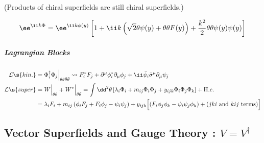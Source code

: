 \begin{flushright}\footnotesize
(Products of chiral superfields are still chiral superfields.)
\end{flushright}
\begin{equation}
 \ee^{\ii k \Phi}=\ee^{\ii k \phi(y)}\left[1+\ii k\left(\sqrt2\theta\psi(y)+\thth F(y)\right)+\frac{k^2}2\thth\psi(y)\psi(y)\right]
\end{equation}
\subparagraph{Lagrangian Blocks}
\begin{align}
 \mathcal L\s{kin.}
={}& \Phi^\dagger_i\Phi_j\Big|_{\thth\bthth}
\leadsto  F^*_iF_j + \Pmu\phi^*_i\Pm\phi_j + \ii\bar\psi_i\bSm\Pm\psi_j\\
 \mathcal L\s{super}
={}& W\Big|_{\thth} + W^*\Big|_{\bthth}
= \int\dd^2\theta
     \left[\lambda_i\Phi_i + m_{ij} \Phi_i\Phi_j
                           + y_{ijk}\Phi_i\Phi_j\Phi_k\right]+\Hc\notag\\
={}& \lambda_iF_i + m_{ij}\left(\phi_iF_j+F_i\phi_j-\psi_i\psi_j\right)
    +y_{ijk}\Bigl[\left(F_i\phi_j\phi_k-\psi_i\psi_j\phi_k\right)+\text{($jki$ and $kij$ terms)}\Bigr]
\end{align}




\subsection{Vector Superfields and Gauge Theory : $V=V^\dagger$}
